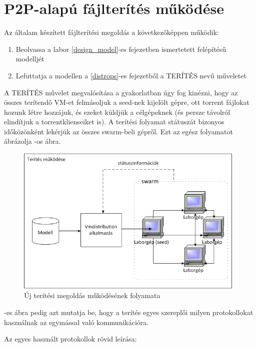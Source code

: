 \section{P2P-alapú fájlterítés működése}
\label{design_apparchi}

Az általam készített fájlterítési megoldás a következőképpen működik:

\begin{enumerate}
  \item Beolvassa a labor \ref{design_model}-es fejezetben ismertetett felépítésű modelljét
  \item Lefuttatja a modellen a \ref{distrops}-es fejezetből a TERÍTÉS nevű műveletet
\end{enumerate}

A TERÍTÉS művelet megvalósítása a gyakorlatban úgy fog kinézni, hogy az összes terítendő VM-et felmásoljuk a seed-nek kijelölt gépre, ott torrent fájlokat hozunk létre hozzájuk, és ezeket küldjük a célgépeknek (és persze távolról elindítjuk a torrentklienseiket is). A terítési folyamat státuszát bizonyos időközönként lekérjük az összes swarm-beli gépről. Ezt az egész folyamatot ábrázolja -os ábra.

\begin{figure}[ht]
	\centering
	\includegraphics[width=110mm, keepaspectratio]{figures/design_overview.png}
	\caption{Új terítési megoldás működésének folyamata}
	\label{fig:designoverview}
\end{figure}

\FloatBarrier

-es ábra pedig azt mutatja be, hogy a terítés egyes szereplői milyen protokollokat használnak az egymással való kommunikációra.

Az egyes használt protokollok rövid leírása:

